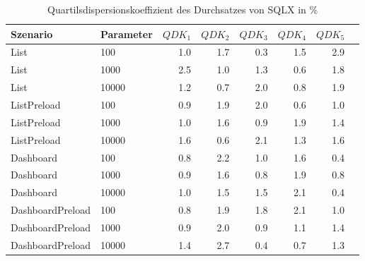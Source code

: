
\begin{table}[ht]
\setlength{\extrarowheight}{-1pt}
\centering
\caption{Quartilsdispersionskoeffizient des Durchsatzes von SQLX in \%}
\begin{tabular}{llrrrrrr}
\toprule
Szenario & Parameter & ${QDK_1}$ & ${QDK_2}$ & ${QDK_3}$& ${QDK_4}$ & ${QDK_5}$ \\
\midrule
	List & 100 &  1.0 &  1.7 &  0.3 &  1.5 & \cellcolor{red!11}  2.9 \\
	List & 1000 & \cellcolor{red!11}  2.5 &  1.0 &  1.3 &  0.6 &  1.8 \\
	List & 10000 &  1.2 &  0.7 & \cellcolor{red!11}  2.0 &  0.8 &  1.9 \\
	ListPreload & 100 &  0.9 &  1.9 &  2.0 &  0.6 &  1.0 \\
	ListPreload & 1000 &  1.0 &  1.6 &  0.9 &  1.9 &  1.4 \\
	ListPreload & 10000 &  1.6 &  0.6 & \cellcolor{red!11}  2.1 &  1.3 &  1.6 \\
	Dashboard & 100 &  0.8 & \cellcolor{red!11}  2.2 &  1.0 &  1.6 &  0.4 \\
	Dashboard & 1000 &  0.9 &  1.6 &  0.8 &  1.9 &  0.8 \\
	Dashboard & 10000 &  1.0 &  1.5 &  1.5 & \cellcolor{red!11}  2.1 &  0.4 \\
	DashboardPreload & 100 &  0.8 &  1.9 &  1.8 & \cellcolor{red!11}  2.1 &  1.0 \\
	DashboardPreload & 1000 &  0.9 & \cellcolor{red!11}  2.0 &  0.9 &  1.1 &  1.4 \\
	DashboardPreload & 10000 &  1.4 & \cellcolor{red!11}  2.7 &  0.4 &  0.7 &  1.3 \\
\bottomrule
\end{tabular}
\label{tab:quartilsdispersionskoeffizient_durchsatz_sqlx}
\end{table}
	